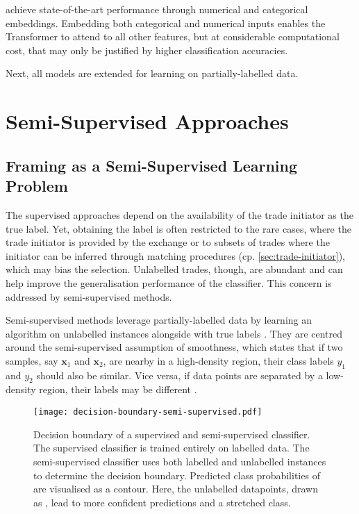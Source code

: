 \textcite[][8]{gorishniyRevisitingDeepLearning2021} achieve state-of-the-art performance through numerical and categorical embeddings. Embedding both categorical and numerical inputs enables the Transformer to attend to all other features, but at considerable computational cost, that may only be justified by higher classification accuracies.

Next, all models are extended for learning on partially-labelled data.

\newpage
\section{Semi-Supervised Approaches}\label{sec:semi-supervised-approaches}
\subsection{Framing as a Semi-Supervised Learning Problem}\label{sec:problem-framing-2}

The supervised approaches depend on the availability of the trade initiator as the true label. Yet, obtaining the label is often restricted to the rare cases, where the trade initiator is provided by the exchange or to subsets of trades where the initiator can be inferred through matching procedures (cp. \cref{sec:trade-initiator}), which may bias the selection. Unlabelled trades, though, are abundant and can help improve the generalisation performance of the classifier. This concern is addressed by semi-supervised methods.

Semi-supervised methods leverage partially-labelled data by learning an algorithm on unlabelled instances alongside with true labels \autocite[][6]{chapelleSemisupervisedLearning2006}. They are centred around the semi-supervised assumption of smoothness, which states that if two samples, say $\mathbf{x}_{1}$ and $\mathbf{x}_{2}$, are nearby in a high-density region, their class labels $y_{1}$ and $y_{2}$ should also be similar. Vice versa, if data points are separated by a low-density region, their labels may be different \autocite[][5]{chapelleSemisupervisedLearning2006}.

\begin{figure}[ht]
    \centering
    \texttt{[image: decision-boundary-semi-supervised.pdf]}
    \caption[Decision Boundary of a Supervised and Semi-Supervised Classifier]{Decision boundary of a supervised and semi-supervised classifier. The supervised classifier is trained entirely on labelled data. The semi-supervised classifier uses both labelled and unlabelled instances to determine the decision boundary. Predicted class probabilities of  are visualised as a contour. Here, the unlabelled datapoints, drawn as , lead to more confident predictions and a stretched class.}
    \label{fig:supervised-semi-supervised}
\end{figure}

